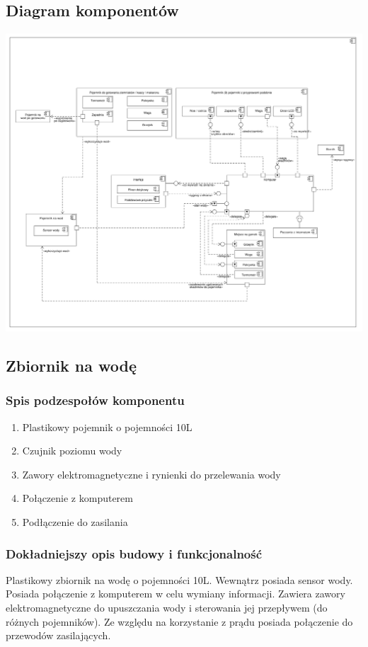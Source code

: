 \documentclass[12pt,a4paper,notitlepage]{article}
\begin{document}
\subsection{Diagram komponentów}
\includegraphics[scale=0.16,width=\textwidth,height=\textheight,keepaspectratio=true]{Diagram_komponentow.pdf}
\newpage

\subsection{Zbiornik na wodę}
\subsubsection{Spis podzespołów komponentu}
\begin{enumerate}
  \item Plastikowy pojemnik o pojemności 10L
  \item Czujnik poziomu wody
  \item Zawory elektromagnetyczne i rynienki do przelewania wody
  \item Połączenie z komputerem
  \item Podłączenie do zasilania
\end{enumerate}

\subsubsection{Dokładniejszy opis budowy i funkcjonalność}
Plastikowy zbiornik na wodę o pojemności 10L. Wewnątrz posiada sensor wody. Posiada połączenie z komputerem w celu wymiany informacji. Zawiera zawory elektromagnetyczne do upuszczania wody i sterowania jej przepływem (do różnych pojemników). Ze względu na korzystanie z prądu posiada połączenie do przewodów zasilających.
\end{document}
